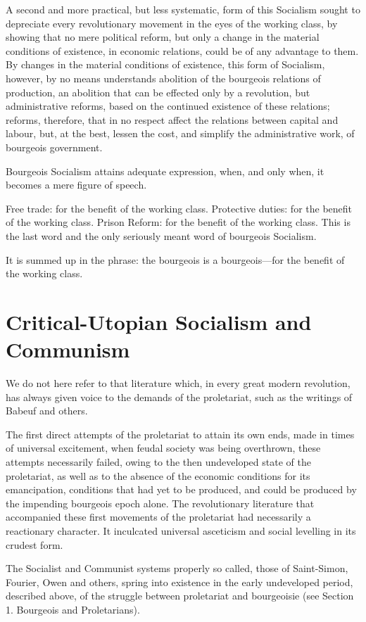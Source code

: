 A second and more practical, but less systematic, form of this
Socialism sought to depreciate every revolutionary movement in the eyes
of the working class, by showing that no mere political reform, but
only a change in the material conditions of existence, in economic
relations, could be of any advantage to them. By changes in the
material conditions of existence, this form of Socialism, however, by
no means understands abolition of the bourgeois relations of
production, an abolition that can be effected only by a revolution, but
administrative reforms, based on the continued existence of these
relations; reforms, therefore, that in no respect affect the relations
between capital and labour, but, at the best, lessen the cost, and
simplify the administrative work, of bourgeois government.

Bourgeois Socialism attains adequate expression, when, and only when,
it becomes a mere figure of speech.

Free trade: for the benefit of the working class. Protective duties:
for the benefit of the working class. Prison Reform: for the benefit of
the working class. This is the last word and the only seriously meant
word of bourgeois Socialism.

It is summed up in the phrase: the bourgeois is a bourgeois—for the
benefit of the working class.

\section*{Critical-Utopian Socialism and Communism}

We do not here refer to that literature which, in every great modern
revolution, has always given voice to the demands of the proletariat,
such as the writings of Babeuf and others.

The first direct attempts of the proletariat to attain its own ends,
made in times of universal excitement, when feudal society was being
overthrown, these attempts necessarily failed, owing to the then
undeveloped state of the proletariat, as well as to the absence of the
economic conditions for its emancipation, conditions that had yet to be
produced, and could be produced by the impending bourgeois epoch alone.
The revolutionary literature that accompanied these first movements of
the proletariat had necessarily a reactionary character. It inculcated
universal asceticism and social levelling in its crudest form.

The Socialist and Communist systems properly so called, those of
Saint-Simon, Fourier, Owen and others, spring into existence in the
early undeveloped period, described above, of the struggle between
proletariat and bourgeoisie (see Section 1. Bourgeois and
Proletarians).

